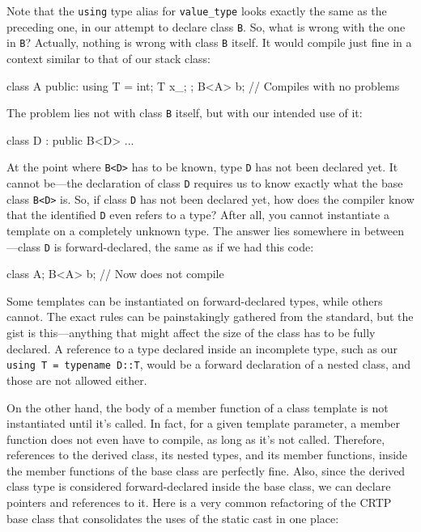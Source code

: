 Note that the \texttt{using} type alias for \texttt{value\_type} looks exactly the same as the preceding one, in our attempt to declare class \texttt{B}. So, what is wrong with the one in \texttt{B}? Actually, nothing is wrong with class \texttt{B} itself. It would compile just fine in a context similar to that of our stack class:

\begin{code}
class A {
  public:
  using T = int;
  T x_;
};
B<A> b; // Compiles with no problems
\end{code}

The problem lies not with class \texttt{B} itself, but with our intended use of it:

\begin{code}
class D : public B<D> ...
\end{code}

At the point where \texttt{B\textless{}D\textgreater{}} has to be known, type \texttt{D} has not been declared yet. It cannot be---the declaration of class \texttt{D} requires us to know exactly what the base class \texttt{B\textless{}D\textgreater{}} is. So, if class \texttt{D} has not been declared yet, how does the compiler know that the identified \texttt{D} even refers to a type? After all, you cannot instantiate a template on a completely unknown type. The answer lies somewhere in between---class \texttt{D} is forward-declared, the same as if we had this code:

\begin{code}
class A;
B<A> b; // Now does not compile
\end{code}

Some templates can be instantiated on forward-declared types, while others cannot. The exact rules can be painstakingly gathered from the standard, but the gist is this---anything that might affect the size of the class has to be fully declared. A reference to a type declared inside an incomplete type, such as our \texttt{using\ T\ =\ typename\ D::T}, would be a forward declaration of a nested class, and those are not allowed either.

On the other hand, the body of a member function of a class template is not instantiated until it's called. In fact, for a given template parameter, a member function does not even have to compile, as long as it's not called. Therefore, references to the derived class, its nested types, and its member functions, inside the member functions of the base class are perfectly fine. Also, since the derived class type is considered forward-declared inside the base class, we can declare pointers and references to it. Here is a very common refactoring of the CRTP base class that consolidates the uses of the static cast in one place:

